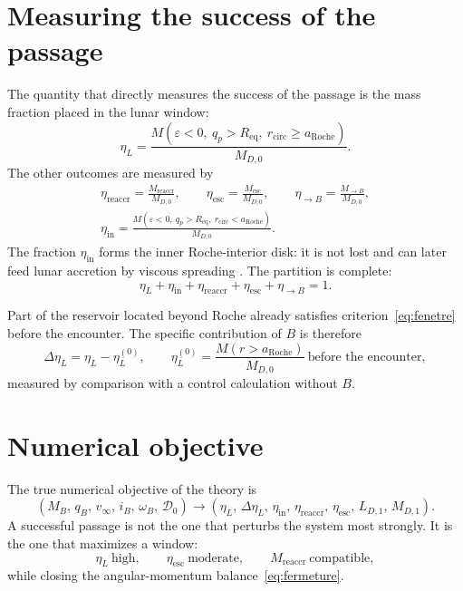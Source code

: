 \documentclass[11pt,a4paper,openany]{report}
\newcommand{\Req}{R_{\mathrm{eq}}}
\newcommand{\aR}{a_{\mathrm{Roche}}}
\begin{document}
\section{Measuring the success of the passage}

The quantity that directly measures the success of the passage is the mass fraction placed in the
lunar window:
\begin{equation}
\boxed{\;\eta_L=\frac{M\!\left(\varepsilon<0,\ q_p>\Req,\ r_{\mathrm{circ}}\ge\aR\right)}{M_{D,0}}.\;}
\label{eq:etaL}
\end{equation}
The other outcomes are measured by
\begin{equation}
\begin{gathered}
\eta_{\mathrm{reaccr}}=\frac{M_{\mathrm{reaccr}}}{M_{D,0}},\qquad
\eta_{\mathrm{esc}}=\frac{M_{\mathrm{esc}}}{M_{D,0}},\qquad
\eta_{\to B}=\frac{M_{\to B}}{M_{D,0}},\\[4pt]
\eta_{\mathrm{in}}=\frac{M(\varepsilon<0,\ q_p>\Req,\ r_{\mathrm{circ}}<\aR)}{M_{D,0}}.
\end{gathered}
\label{eq:etas}
\end{equation}
The fraction $\eta_{\mathrm{in}}$ forms the inner Roche-interior disk: it is not lost and can later
feed lunar accretion by viscous spreading \cite{SalmonCanup2012}. The partition is complete:
\begin{equation}
\boxed{\;\eta_L+\eta_{\mathrm{in}}+\eta_{\mathrm{reaccr}}+\eta_{\mathrm{esc}}+\eta_{\to B}=1.\;}
\label{eq:partition}
\end{equation}

Part of the reservoir located beyond Roche already satisfies criterion~\eqref{eq:fenetre} before
the encounter. The specific contribution of $B$ is therefore
\begin{equation}
\Delta\eta_L=\eta_L-\eta_L^{(0)},\qquad
\eta_L^{(0)}=\frac{M(r>\aR)}{M_{D,0}}\ \text{before the encounter},
\label{eq:DeltaetaL}
\end{equation}
measured by comparison with a control calculation without $B$.

\section{Numerical objective}

The true numerical objective of the theory is
\begin{equation}
\boxed{\;\left(M_B,\,q_B,\,v_\infty,\,i_B,\,\omega_B,\,\mathcal{D}_0\right)\longrightarrow
\left(\eta_L,\,\Delta\eta_L,\,\eta_{\mathrm{in}},\,\eta_{\mathrm{reaccr}},\,\eta_{\mathrm{esc}},\,
L_{D,1},\,M_{D,1}\right).\;}
\label{eq:objectif}
\end{equation}
A successful passage is not the one that perturbs the system most strongly. It is the one that
maximizes a window:
\begin{equation}
\boxed{\;\eta_L\ \text{high},\qquad \eta_{\mathrm{esc}}\ \text{moderate},\qquad
M_{\mathrm{reaccr}}\ \text{compatible},\;}
\label{eq:fenetre-succes}
\end{equation}
while closing the angular-momentum balance~\eqref{eq:fermeture}.
\end{document}
